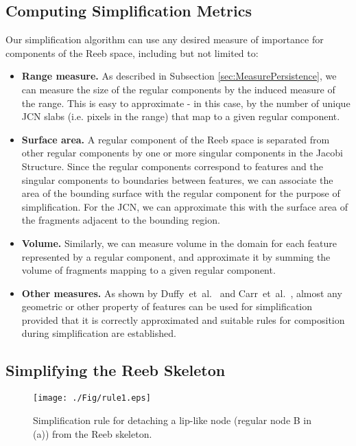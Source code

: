 \documentclass[twocolumn]{article}
\newcommand{\subsecref}[1]{Subsection \ref{sec:#1}}
\newcommand{\etal}{et~al.}
\begin{document}
\subsection{Computing Simplification Metrics}
\label{sec:metric}
Our simplification algorithm 
can use any desired measure of importance for components of the Reeb
space, including but not limited to:

\begin{itemize}
\item \textbf{Range measure.} As described in \subsecref{MeasurePersistence}, we can measure
the size of the regular components by the induced measure of the
range. This is easy to approximate - in this case, by the number 
of unique JCN slabs (i.e. pixels in the range) that map to a given
regular component.

\item \textbf{Surface area.} A regular component of the Reeb space is separated from
other regular components by one or more singular components in the Jacobi Structure. Since
the regular components correspond to features and the singular components to boundaries
between features, we can associate the area of the bounding surface with the regular component
for the purpose of simplification.  For the JCN, we can approximate this with the
surface area of the fragments adjacent to the bounding region.

\item \textbf{Volume.} Similarly, we can measure volume in the domain for each feature represented
by a regular component, and approximate it by summing the volume of fragments mapping 
to a given regular component.

\item \textbf{Other measures.}  As shown by Duffy~\etal~\cite{DCM13} and Carr~\etal~\cite{CSv10},
almost any geometric or other property of features can be used for simplification provided that it is
correctly approximated and suitable rules for composition during 
simplification are established.
\end{itemize}

\subsection{Simplifying the Reeb Skeleton}
\label{sec:rules}
\begin{figure}[h!]
\begin{center}
\texttt{[image: ./Fig/rule1.eps]}
\caption{Simplification rule for detaching a lip-like node (regular
  node B in (a)) from the Reeb skeleton.}
\label{fig:rules-simplification}
\end{center}
\end{figure}
\end{document}
